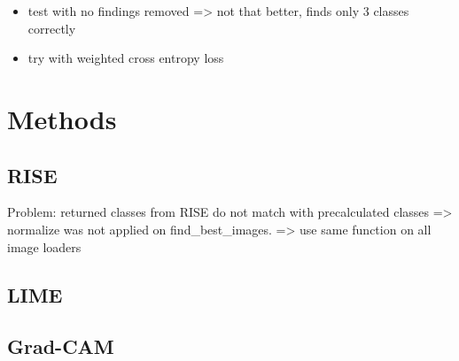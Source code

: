 \begin{itemize}
    \item test with no findings removed => not that better, finds only 3 classes correctly
    \item try with weighted cross entropy loss
\end{itemize}


\section{Methods}

\subsection{RISE}
Problem: returned classes from RISE do not match with precalculated classes
=> normalize was not applied on find\_best\_images.
=> use same function on all image loaders

\subsection{LIME}
\subsection{Grad-CAM}

